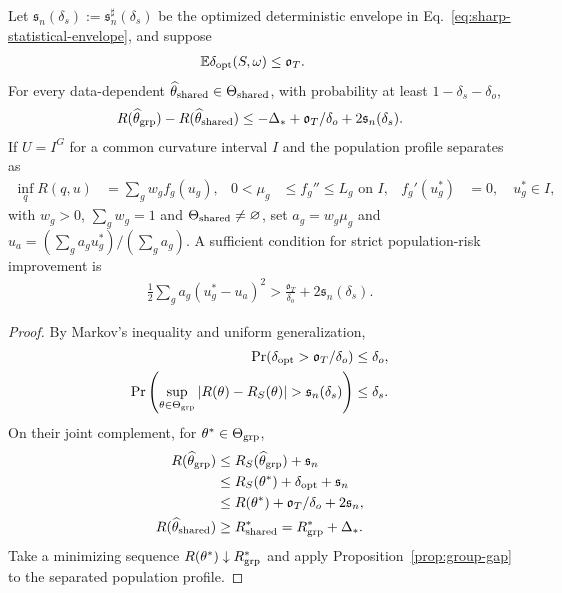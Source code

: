 \begin{theorem}
\label{thm:rigid-risk-comparison}
Let $\mathfrak s_n(\delta_s):=\mathfrak s_n^\sharp(\delta_s)$ be the optimized deterministic envelope in Eq.~\eqref{eq:sharp-statistical-envelope}, and suppose
\begin{align}
 \mathbb E\delta_{\rm opt}(S,\omega)&\le\mathfrak o_T.
\end{align}
For every data-dependent $\widehat\theta_{\rm shared}\in\Theta_{\rm shared}$, with probability at least $1-\delta_s-\delta_o$,
\begin{align}
 R(\widehat\theta_{\rm grp})-R(\widehat\theta_{\rm shared})
 \le-\Delta_*+\mathfrak o_T/\delta_o+2\mathfrak s_n(\delta_s).
\end{align}
If $U=I^G$ for a common curvature interval $I$ and the population profile separates as
\begin{align}
 \inf_qR(q,u)&=\sum_gw_gf_g(u_g),&
 0<\mu_g&\le f_g''\le L_g\text{ on }I,&f_g'(u_g^*)&=0,\quad u_g^*\in I,
\end{align}
with $w_g>0$, $\sum_gw_g=1$ and $\Theta_{\rm shared}\ne\varnothing$, set $a_g=w_g\mu_g$ and $u_a=(\sum_ga_gu_g^*)/(\sum_ga_g)$. A sufficient condition for strict population-risk improvement is
\begin{align}
 \frac12\sum_ga_g(u_g^*-u_a)^2
 >\frac{\mathfrak o_T}{\delta_o}+2\mathfrak s_n(\delta_s).
\end{align}
\end{theorem}
\begin{proof}
By Markov's inequality and uniform generalization,
\begin{align}
 \Pr(\delta_{\rm opt}>\mathfrak o_T/\delta_o)&\le\delta_o,\\
 \Pr\left(\sup_{\theta\in\Theta_{\rm grp}}|R(\theta)-R_S(\theta)|>
 \mathfrak s_n(\delta_s)\right)&\le\delta_s.
\end{align}
On their joint complement, for $\theta^*\in\Theta_{\rm grp}$,
\begin{align}
 R(\widehat\theta_{\rm grp})
 &\le R_S(\widehat\theta_{\rm grp})+\mathfrak s_n\\
 &\le R_S(\theta^*)+\delta_{\rm opt}+\mathfrak s_n\\
 &\le R(\theta^*)+\mathfrak o_T/\delta_o+2\mathfrak s_n,\\
 R(\widehat\theta_{\rm shared})&\ge R_{\rm shared}^*=R_{\rm grp}^*+\Delta_*.
\end{align}
Take a minimizing sequence $R(\theta^*)\downarrow R_{\rm grp}^*$ and apply Proposition~\ref{prop:group-gap} to the separated population profile.
\end{proof}

